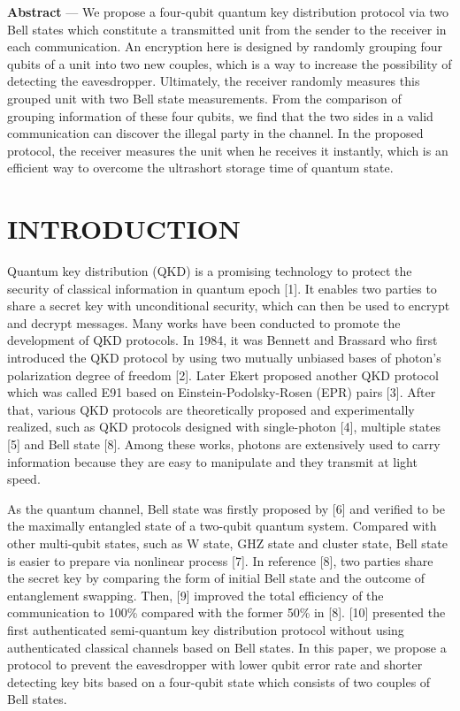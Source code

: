 \documentclass[a4paper,11pt]{article}
\begin{document}
\textbf{Abstract} --- We propose a four-qubit quantum key distribution protocol via two Bell states which constitute a transmitted unit from the sender to the receiver in each communication. An encryption here is designed by randomly grouping four qubits of a unit into two new couples, which is a way to increase
the possibility of detecting the eavesdropper. Ultimately, the receiver randomly measures this grouped unit with two Bell state measurements. From the comparison of grouping information of these four qubits, we find that the two sides in a valid communication can discover the illegal party in the channel. In the proposed protocol, the receiver measures the unit when he receives it instantly, which is an efficient way to overcome the ultrashort storage time of quantum state.


\section{INTRODUCTION}

Quantum key distribution (QKD) is a promising technology to protect the security of classical information in quantum epoch [1]. It enables two parties to share a secret key with unconditional security, which can then be used to encrypt and decrypt messages. Many works have been conducted to promote the development of QKD protocols. In 1984, it was Bennett and Brassard who first introduced the QKD protocol by using two mutually unbiased bases of photon’s polarization degree of freedom [2]. Later Ekert proposed another QKD protocol which was called E91 based on Einstein-Podolsky-Rosen (EPR) pairs [3]. After that, various QKD protocols are theoretically proposed and experimentally realized, such as QKD protocols designed with single-photon [4], multiple states [5] and Bell state [8]. Among these works, photons are extensively used to carry information because they are easy to manipulate and they transmit at light speed.

As the quantum channel, Bell state was firstly proposed by [6] and verified to be the maximally entangled state of a two-qubit quantum system. Compared with other multi-qubit states, such as W state, GHZ state and cluster state, Bell state is easier to prepare via nonlinear process [7]. In reference [8], two parties share the secret key by comparing the form of initial Bell state and the outcome of entanglement swapping. Then, [9] improved the total efficiency of the communication to 100\% compared with the former 50\% in [8]. [10] presented the first authenticated semi-quantum key distribution protocol
without using authenticated classical channels based on Bell states. In this paper, we propose a protocol to prevent the eavesdropper with lower qubit error rate and shorter detecting key bits based on a four-qubit state which consists of two couples of Bell states.
\end{document}
